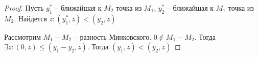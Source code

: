 \documentclass[document.tex]{subfiles}
\begin{document}
\begin{proof}
    Пусть $y_1^*$ -- ближайшая к $M_2$ точка из $M_1$, $y_2^*$ -- ближайшая к $M_1$ точка из $M_2$. Найдется $z: (y_1^*,
    z) < (y_2, z)$

    Рассмотрим $M_1 - M_2$ -- разность Минковского. $0 \not \in M_1 - M_2$. Тогда $\exists z: (0, z) \leq (y_1 - y_2,
    z)$. Тогда $(y_1, z) < (y_2, z)$
\end{proof}
\end{document}
